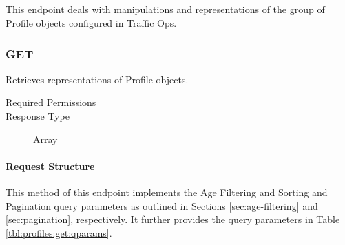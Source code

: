 %
%

\subsection{}
This endpoint deals with manipulations and representations of the group of
Profile objects configured in Traffic Ops.

\subsubsection{GET}
Retrieves representations of Profile objects.
\begin{description}
	\item[Required Permissions] 
	\item[Response Type] Array
\end{description}

\paragraph{Request Structure}
This method of this endpoint implements the Age Filtering and Sorting and
Pagination query parameters as outlined in Sections \ref{sec:age-filtering} and
\ref{sec:pagination}, respectively. It further provides the query parameters in
Table \ref{tbl:profiles:get:qparams}.

